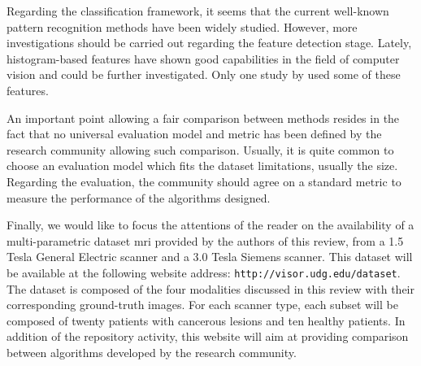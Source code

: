 Regarding the classification framework, it seems that the current well-known pattern recognition methods have been widely studied. However, more investigations should be carried out regarding the feature detection stage. Lately, histogram-based features have shown good capabilities in the field of computer vision and could be further investigated. Only one study by \cite{Liu2013} used some of these features.

An important point allowing a fair comparison between methods resides in the fact that no universal evaluation model and metric has been defined by the research community allowing such comparison. Usually, it is quite common to choose an evaluation model which fits the dataset limitations, usually the size. Regarding the evaluation, the community should agree on a standard metric to measure the performance of the algorithms designed.

Finally, we would like to focus the attentions of the reader on the availability of a multi-parametric dataset \ac{mri} provided by the authors of this review, from a 1.5 Tesla General Electric scanner and a 3.0 Tesla Siemens scanner. This dataset will be available at the following website address: \texttt{http://visor.udg.edu/dataset}. The dataset is composed of the four modalities discussed in this review with their corresponding ground-truth images. For each scanner type, each subset will be composed of twenty patients with cancerous lesions and ten healthy patients. In addition of the repository activity, this website will aim at providing comparison between algorithms developed by the research community.

